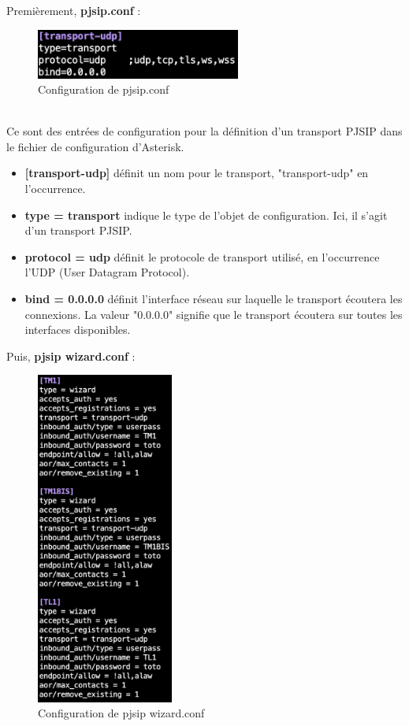 \documentclass[12pt, a4paper]{article}
\begin{document}
	Premièrement, \textbf{pjsip.conf} :
	\begin{figure}[h]
		\centering
		\includegraphics[width=0.6\textwidth]{img/pjsip.png}
		\caption{Configuration de pjsip.conf}
		\label{fig:pjsip}
	\end{figure}\\
	Ce sont des entrées de configuration pour la définition d'un transport 
	PJSIP dans le fichier de configuration d'Asterisk.
	\begin{itemize}
		\item \textbf{[transport-udp]} définit un nom pour le transport, "transport-udp" en l'occurrence.\\
		\item \textbf{type = transport} indique le type de l'objet de configuration. Ici, il s'agit d'un transport PJSIP.\\
		\item \textbf{protocol = udp} définit le protocole de transport utilisé, en l'occurrence l'UDP (User Datagram Protocol).\\
		\item \textbf{bind = 0.0.0.0} définit l'interface réseau sur laquelle le transport écoutera les connexions. La valeur "0.0.0.0" signifie que le transport écoutera sur toutes les interfaces disponibles.\\
	\end{itemize}

	\newpage 
	

	Puis, \textbf{pjsip wizard.conf} :
	\begin{figure}[h]
		\centering
		\includegraphics[width=0.4\textwidth]{img/wizard.png}
		\caption{Configuration de pjsip wizard.conf}
		\label{fig:wiz}
	\end{figure}\\
\end{document}

